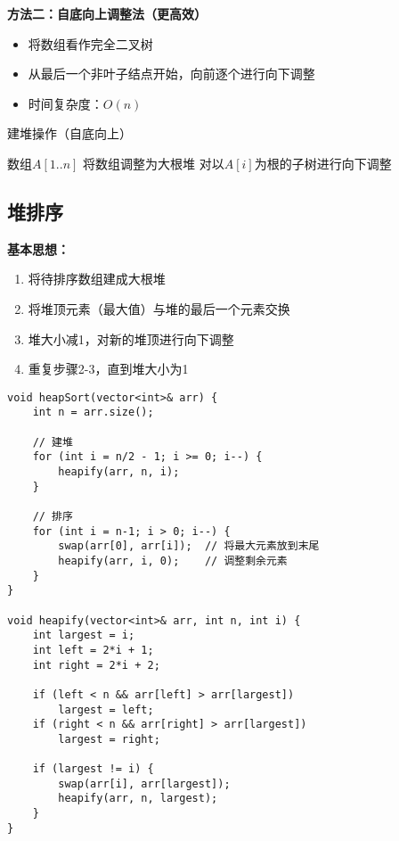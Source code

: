 \documentclass[12pt,a4paper]{amsart}
\begin{document}
\textbf{方法二：自底向上调整法（更高效）}
\begin{itemize}
\item 将数组看作完全二叉树
\item 从最后一个非叶子结点开始，向前逐个进行向下调整
\item 时间复杂度：$O(n)$
\end{itemize}

\begin{algorithm}[H]
\caption{建堆操作（自底向上）}
\begin{algorithmic}[1]
\REQUIRE 数组$A[1..n]$
\ENSURE 将数组调整为大根堆
    \STATE 对以$A[i]$为根的子树进行向下调整
\ENDFOR
\end{algorithmic}
\end{algorithm}

\subsection{堆排序}

\textbf{基本思想：}
\begin{enumerate}
\item 将待排序数组建成大根堆
\item 将堆顶元素（最大值）与堆的最后一个元素交换
\item 堆大小减1，对新的堆顶进行向下调整
\item 重复步骤2-3，直到堆大小为1
\end{enumerate}

\begin{lstlisting}[caption=堆排序算法实现]
void heapSort(vector<int>& arr) {
    int n = arr.size();
    
    // 建堆
    for (int i = n/2 - 1; i >= 0; i--) {
        heapify(arr, n, i);
    }
    
    // 排序
    for (int i = n-1; i > 0; i--) {
        swap(arr[0], arr[i]);  // 将最大元素放到末尾
        heapify(arr, i, 0);    // 调整剩余元素
    }
}

void heapify(vector<int>& arr, int n, int i) {
    int largest = i;
    int left = 2*i + 1;
    int right = 2*i + 2;
    
    if (left < n && arr[left] > arr[largest])
        largest = left;
    if (right < n && arr[right] > arr[largest])
        largest = right;
        
    if (largest != i) {
        swap(arr[i], arr[largest]);
        heapify(arr, n, largest);
    }
}
\end{lstlisting}
\end{document}
